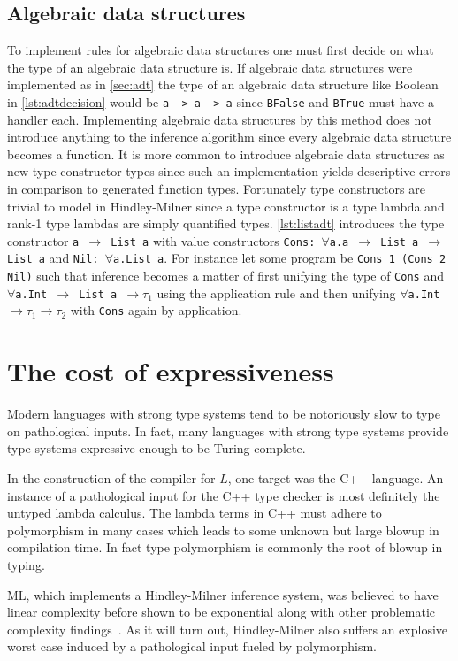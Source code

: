 \documentclass[11pt,oneside,a4paper]{report}
\begin{document}
\subsection{Algebraic data structures}
To implement rules for algebraic data structures one must first decide on what the type of an algebraic data structure is.
If algebraic data structures were implemented as in \autoref{sec:adt} the type of an algebraic data structure like Boolean in \autoref{lst:adtdecision} would be \texttt{a -> a -> a} since \texttt{BFalse} and \texttt{BTrue} must have a handler each.
Implementing algebraic data structures by this method does not introduce anything to the inference algorithm since every algebraic data structure becomes a function.
It is more common to introduce algebraic data structures as new type constructor types since such an implementation yields descriptive errors in comparison to generated function types.
Fortunately type constructors are trivial to model in Hindley-Milner since a type constructor is a type lambda and rank-1 type lambdas are simply quantified types.
\autoref{lst:listadt} introduces the type constructor \texttt{a $\rightarrow$ List a} with value constructors \texttt{Cons: $\forall$a.a $\rightarrow$ List a $\rightarrow$ List a} and \texttt{Nil: $\forall$a.List a}.
For instance let some program be \texttt{Cons 1 (Cons 2 Nil)} such that inference becomes a matter of first unifying the type of \texttt{Cons} and \texttt{$\forall$a.Int $\rightarrow$ List a $\rightarrow \tau_1$} using the application rule and then unifying \texttt{$\forall$a.Int $\rightarrow \tau_1 \rightarrow \tau_2$} with \texttt{Cons} again by application.


\section{The cost of expressiveness}
Modern languages with strong type systems tend to be notoriously slow to type on pathological inputs.
In fact, many languages with strong type systems provide type systems expressive enough to be Turing-complete.

In the construction of the compiler for $L$, one target was the C++ language.
An instance of a pathological input for the C++ type checker is most definitely the untyped lambda calculus.
The lambda terms in C++ must adhere to polymorphism in many cases which leads to some unknown but large blowup in compilation time.
In fact type polymorphism is commonly the root of blowup in typing.

ML, which implements a Hindley-Milner inference system, was believed to have linear complexity before shown to be exponential along with other problematic complexity findings~\cite{mairson1989deciding}.
As it will turn out, Hindley-Milner also suffers an explosive worst case induced by a pathological input fueled by polymorphism.
\end{document}
